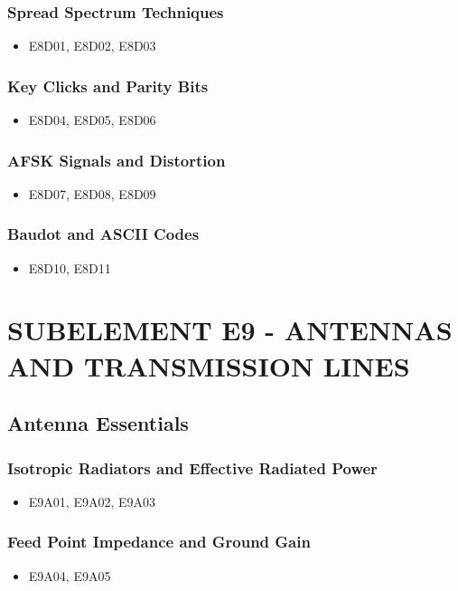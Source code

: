 \documentclass{book}
\begin{document}
\subsection{Spread Spectrum Techniques}
\begin{itemize}
    \item E8D01, E8D02, E8D03
\end{itemize}
\subsection{Key Clicks and Parity Bits}
\begin{itemize}
    \item E8D04, E8D05, E8D06
\end{itemize}
\subsection{AFSK Signals and Distortion}
\begin{itemize}
    \item E8D07, E8D08, E8D09
\end{itemize}
\subsection{Baudot and ASCII Codes}
\begin{itemize}
    \item E8D10, E8D11
\end{itemize}

\chapter{SUBELEMENT E9 - ANTENNAS AND TRANSMISSION LINES}

\section{Antenna Essentials}
\subsection{Isotropic Radiators and Effective Radiated Power}
\begin{itemize}
    \item E9A01, E9A02, E9A03
\end{itemize}
\subsection{Feed Point Impedance and Ground Gain}
\begin{itemize}
    \item E9A04, E9A05
\end{itemize}
\end{document}
